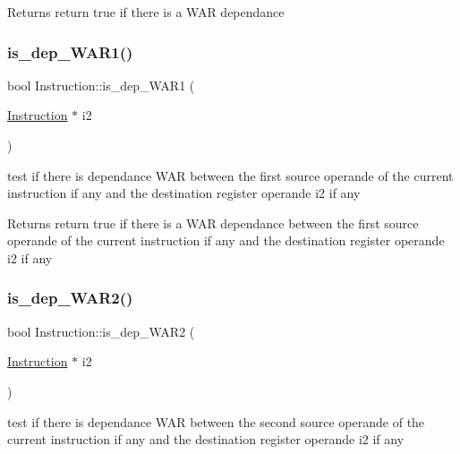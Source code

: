 \begin{DoxyReturn}{Returns}
return true if there is a W\+AR dependance 
\end{DoxyReturn}
\mbox{\label{class_instruction_a36c0faedd74af14b403ba7063af5d07f}} 
\subsubsection{\texorpdfstring{is\+\_\+dep\+\_\+\+W\+A\+R1()}{is\_dep\_WAR1()}}
{\footnotesize\ttfamily bool Instruction\+::is\+\_\+dep\+\_\+\+W\+A\+R1 (\begin{DoxyParamCaption}\item[{\mbox{\hyperlink{class_instruction}{Instruction}} $\ast$}]{i2 }\end{DoxyParamCaption})}



test if there is dependance W\+AR between the first source operande of the current instruction if any and the destination register operande i2 if any 

\begin{DoxyReturn}{Returns}
return true if there is a W\+AR dependance between the first source operande of the current instruction if any and the destination register operande i2 if any 
\end{DoxyReturn}
\mbox{\label{class_instruction_a04471df677984f67ec13de88f55e3703}} 
\subsubsection{\texorpdfstring{is\+\_\+dep\+\_\+\+W\+A\+R2()}{is\_dep\_WAR2()}}
{\footnotesize\ttfamily bool Instruction\+::is\+\_\+dep\+\_\+\+W\+A\+R2 (\begin{DoxyParamCaption}\item[{\mbox{\hyperlink{class_instruction}{Instruction}} $\ast$}]{i2 }\end{DoxyParamCaption})}



test if there is dependance W\+AR between the second source operande of the current instruction if any and the destination register operande i2 if any ~\newline
 

